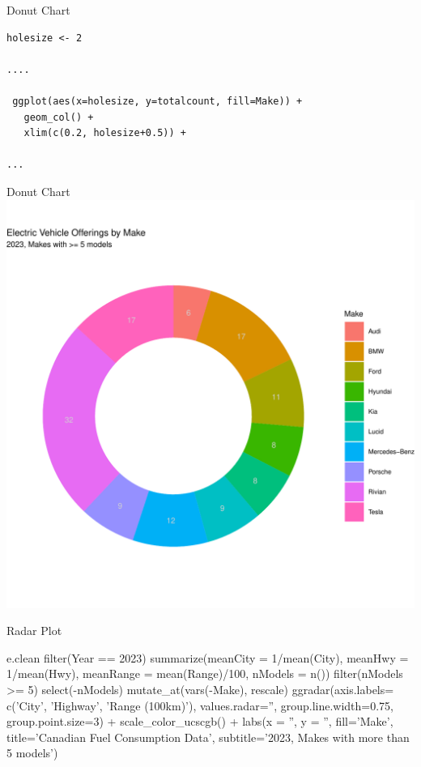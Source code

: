 \documentclass[ignorenonframetext,xcolor=x11names]{beamer}
\begin{document}
\begin{frame}[fragile]{Donut Chart}
\footnotesize
\begin{verbatim}
holesize <- 2

....

 ggplot(aes(x=holesize, y=totalcount, fill=Make)) +
   geom_col() + 
   xlim(c(0.2, holesize+0.5)) +
     
...

\end{verbatim}
\end{frame}

\begin{frame}{Donut Chart}
\centering
  \includegraphics[width=.8\textwidth]{fuel.donut.pdf}
\end{frame}

\begin{frame}[fragile]{Radar Plot}
\footnotesize
\begin{Rcode}
e.clean %
  filter(Year == 2023) %
  summarize(meanCity = 1/mean(City), 
            meanHwy = 1/mean(Hwy), 
            meanRange = mean(Range)/100, 
            nModels = n()) %
  filter(nModels >= 5) %
  select(-nModels) %
  mutate_at(vars(-Make), rescale) %
  ggradar(axis.labels=
             c('City', 'Highway', 'Range (100km)'), 
          values.radar='', 
          group.line.width=0.75, 
          group.point.size=3) +
     scale_color_ucscgb() +
  labs(x = '', y = '',  fill='Make', 
       title='Canadian Fuel Consumption Data', 
       subtitle='2023, Makes with more than 5 models')
\end{Rcode}
\end{frame}
\end{document}
